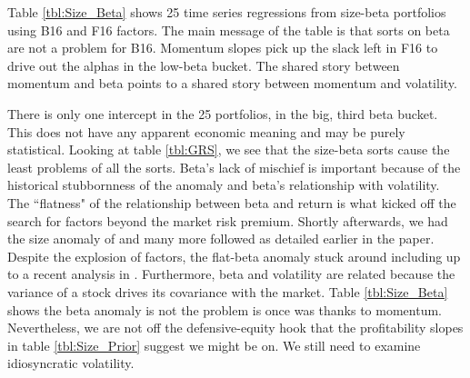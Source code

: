 
Table \ref{tbl:Size_Beta} shows 25 time series regressions from size-beta
portfolios using B16 and F16 factors.
The main message of the table is that sorts on beta are not a problem for B16.
Momentum slopes pick up the slack left in F16 to drive out the alphas in the
low-beta bucket.
The shared story between momentum and beta points to a shared story between
momentum and volatility.

There is only one intercept in the 25 portfolios, in the big, third beta
bucket. This does not have any apparent economic meaning and may be purely
statistical. Looking at table \ref{tbl:GRS}, we see that the size-beta sorts
cause the least problems of all the sorts.
Beta's lack of mischief is important because of the historical stubbornness of
the anomaly and beta's relationship with volatility.
The ``flatness" of the relationship between beta and return
\parencite{jensen1972capital} is what kicked off the search for factors beyond
the market risk premium.
Shortly afterwards, we had the size anomaly of \textcite{banz1981relationship}
and many more followed as detailed earlier in the paper.
Despite the explosion of factors, the flat-beta anomaly stuck around
including up to a recent analysis in \textcite{fama2016dissecting}.
Furthermore, beta and volatility are related because the variance of a stock
drives its covariance with the market.
Table \ref{tbl:Size_Beta} shows the beta anomaly is not the problem is once
was thanks to momentum.
Nevertheless, we are not off the defensive-equity hook that the profitability
slopes in table \ref{tbl:Size_Prior} suggest we might be on.
We still need to examine idiosyncratic volatility.
